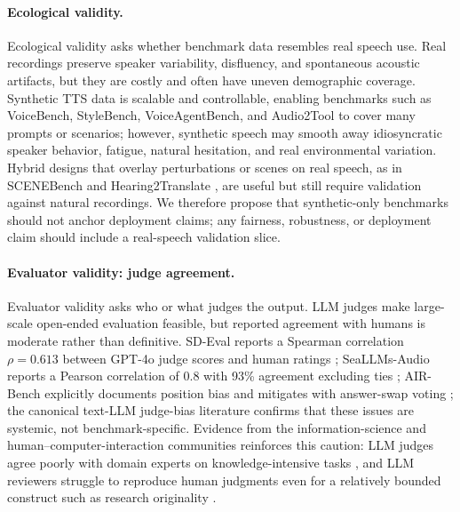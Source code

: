 \paragraph{Ecological validity.}
Ecological validity asks whether benchmark data resembles real speech use.
Real recordings preserve speaker variability, disfluency, and spontaneous
acoustic artifacts, but they are costly and often have uneven demographic
coverage. Synthetic TTS data is scalable and controllable, enabling
benchmarks such as VoiceBench, StyleBench, VoiceAgentBench, and Audio2Tool
\citep{chen2024voicebench,zhao2026stylebench,jain2025voiceagentbench,pahwa2026audio2tool}
to cover many prompts or scenarios; however, synthetic speech may smooth
away idiosyncratic speaker behavior, fatigue, natural hesitation, and
real environmental variation. Hybrid designs that overlay perturbations
or scenes on real speech, as in SCENEBench and Hearing2Translate
\citep{iyer2026scenebench,papi2025hearing2translate}, are useful but still
require validation against natural recordings. We therefore propose
that synthetic-only benchmarks should not anchor deployment claims; any
fairness, robustness, or deployment claim should include a real-speech
validation slice.

\paragraph{Evaluator validity: judge agreement.}
Evaluator validity asks who or what judges the output. LLM judges make
large-scale open-ended evaluation feasible, but reported agreement with
humans is moderate rather than definitive. SD-Eval reports a Spearman
correlation $\rho = 0.613$ between GPT-4o judge scores and human ratings
\citep{ao2024sdeval}; SeaLLMs-Audio reports a Pearson correlation of 0.8
with 93\% agreement excluding ties \citep{liu2025seallmsaudio}; AIR-Bench
explicitly documents position bias and mitigates with answer-swap voting
\citep{yang2024airbench}; the canonical text-LLM judge-bias literature
\citep{zheng2023judging} confirms that these issues are systemic, not
benchmark-specific. Evidence from the information-science and
human--computer-interaction communities reinforces this caution: LLM
judges agree poorly with domain experts on knowledge-intensive tasks
\citep{szymanski2025limitations}, and LLM reviewers struggle to reproduce
human judgments even for a relatively bounded construct such as research
originality \citep{huang2024qualified}.

